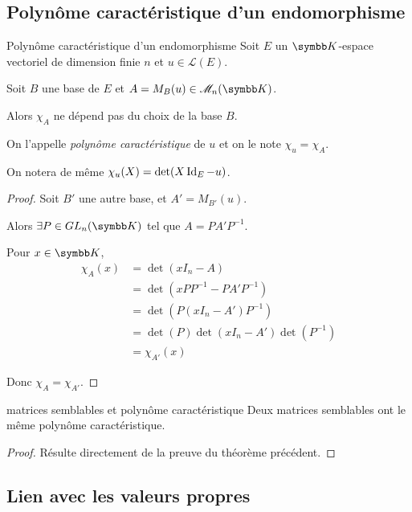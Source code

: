 \subsection{Polynôme caractéristique d'un endomorphisme}

\begin{theoreme}{Polynôme caractéristique d'un endomorphisme}{}
    Soit $E$ un $\K$-espace vectoriel de dimension finie $n$ et $u \in \mathscr L(E)$.

    Soit $B$ une base de $E$ et $A = M_B(u) \in \mathscr M_n(\K)$. 

    Alors $\chi_A$ ne dépend pas du choix de la base $B$.

    On l'appelle \emph{polynôme caractéristique} de $u$ et on le note $\chi_u = \chi_A$.

    On notera de même $\chi_u(X) = \det(X \operatorname{Id}_E - u)$.
\end{theoreme}


\begin{proof}
    Soit $B'$ une autre base, et $A' = M_{B'}(u)$.

    Alors $\exists P \in GL_n(\K)$ tel que $A = P A' P^{-1}$.

    Pour $x \in \K$, 
    \begin{align}
        \chi_A(x) & = \det(x I_n - A) \\
                        & = \det(x PP^{-1} - P A' P^{-1}) \\
                        & = \det(P(x I_n - A') P^{-1}) \\
                        & = \det(P) \det(x I_n - A') \det(P^{-1}) \\
                        & = \chi_{A'}(x)
    \end{align}

    Donc $\chi_A = \chi_{A'}$.
\end{proof}

\begin{corollaire}{matrices semblables et polynôme caractéristique}{}
    Deux matrices semblables ont le même polynôme caractéristique.
\end{corollaire}

\begin{proof}
    Résulte directement de la preuve du théorème précédent.
\end{proof}


\subsection{Lien avec les valeurs propres }

